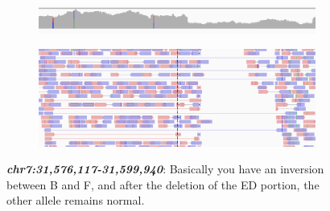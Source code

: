 \begin{figure}[H]
    \centering
    
    \begin{subfigure}[t]{0.55\textwidth}
        \centering
        \includegraphics[width=1\textwidth]{cov3.PNG}
    \end{subfigure}
    \begin{subfigure}[t]{0.55\textwidth}
        \centering
        \includegraphics[width=1\textwidth]{pos3.PNG}
    \end{subfigure}
    \caption{\textit{\textbf{chr7:31,576,117-31,599,940}}: Basically you have an inversion between B and F, and after the deletion of the ED portion, the other allele remains normal.}
    \label{fig:3}
\end{figure}


